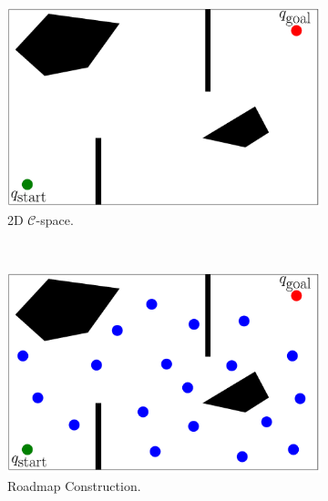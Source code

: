 \documentclass{ctuthesis}
\begin{document}
\begin{figure}[!ht]
  \centering
  \begin{subfigure}[b]{0.45\textwidth}
      \includegraphics[width=\textwidth]{figChap3/PRMmaze40pt.pdf}
      \caption{2D $\mathcal{C}$-space.}
      \label{fig:prm_maze}
  \end{subfigure}
  ~ %
  \begin{subfigure}[b]{0.45\textwidth}
      \includegraphics[width=\textwidth]{figChap3/PRMsamplePoints40pt.pdf}
      \caption{Roadmap Construction.}
      \label{fig:random_points}
  \end{subfigure}
  ~ %
  \begin{subfigure}[b]{0.45\textwidth}

\end{subfigure}
\end{figure}
\end{document}
